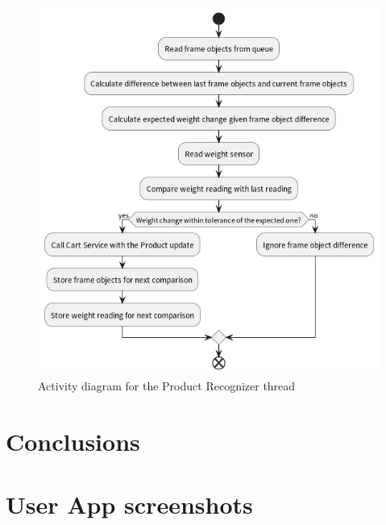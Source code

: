 \documentclass[openright]{normas-utf-tex} %
\begin{document}
\begin{figure}[H]
	\centering
	\includegraphics[width=1\textwidth]{./images/Product Recognizer Activity.png}
	\caption[Activity diagram for the Product Recognizer thread]{Activity diagram for the Product Recognizer thread}
	\label{fig:dummy}
\end{figure}

\chapter{Conclusions}


\clearpage %
\label{bibstart}
\label{bibend}

\apendice
\chapter{User App screenshots}
\label{ap:userapp}
\end{document}
